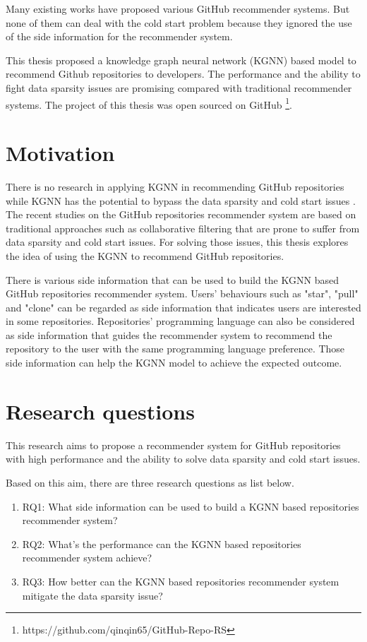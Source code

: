 \documentclass[11pt,twoside]{report}
\begin{document}
Many existing works have proposed various GitHub recommender systems. But none of them can deal with the cold start problem because they ignored the use of the side information for the recommender system.

This thesis proposed a knowledge graph neural network (KGNN) based model to recommend Github repositories to developers. The performance and the ability to fight data sparsity issues are promising compared with traditional recommender systems. The project of this thesis was open sourced on GitHub \footnote{https://github.com/qinqin65/GitHub-Repo-RS}.

\section{Motivation}
There is no research in applying KGNN in recommending GitHub repositories while KGNN has the potential to bypass the data sparsity and cold start issues \cite{mansur_review_nodate}. The recent studies on the GitHub repositories recommender system are based on traditional approaches such as collaborative filtering that are prone to suffer from data sparsity and cold start issues. For solving those issues, this thesis explores the idea of using the KGNN to recommend GitHub repositories.

There is various side information that can be used to build the KGNN based GitHub repositories recommender system. Users’ behaviours such as "star", "pull" and "clone" can be regarded as side information that indicates users are interested in some repositories. Repositories' programming language can also be considered as side information that guides the recommender system to recommend the repository to the user with the same programming language preference. Those side information can help the KGNN model to achieve the expected outcome.

\section{Research questions}
This research aims to propose a recommender system for GitHub repositories with high performance and the ability to solve data sparsity and cold start issues.

Based on this aim, there are three research questions as list below.

\begin{enumerate}
    \item RQ1: What side information can be used to build a KGNN based repositories recommender system?
    \item RQ2: What’s the performance can the KGNN based repositories recommender system achieve?
    \item RQ3: How better can the KGNN based repositories recommender system mitigate the data sparsity issue?
\end{enumerate}
\end{document}
